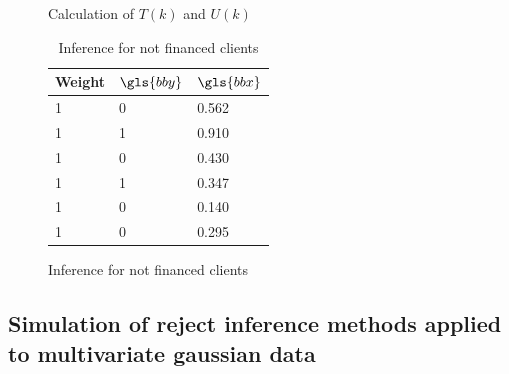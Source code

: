 \begin{table}
{\begin{multicols}{3}
\begin{subfigure}[t]{0.31\textwidth}
\caption{Calculation of $T(k)$ and $U(k)$}
\label{parcel:sfig2}
\end{subfigure}

\columnbreak

\begin{subfigure}[t]{0.31\textwidth}
\begin{center}
\begin{adjustbox}{max width=\textwidth}
\begin{tabular}{l l l}
\toprule
\textbf{Weight} & \textbf{${\gls{bby}}$} & \textbf{${\gls{bbx}}$}\\
\midrule
1 & 0 & 0.562 \\
1 & 1 & 0.910 \\
1 & 0 & 0.430 \\
1 & 1 & 0.347 \\
1 & 0 & 0.140 \\
1 & 0 & 0.295 \\
\bottomrule
\end{tabular}
\end{adjustbox}
\end{center}

\caption{Inference for not financed clients}
\label{parcel:sfig3}
\end{subfigure}

\end{multicols}
}
\end{table}



\subsection{Simulation of reject inference methods applied to multivariate gaussian data} \label{subsec:app_reject_sim}

